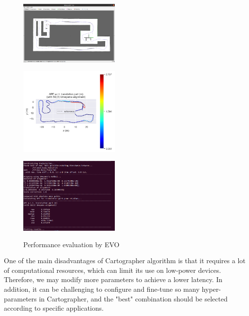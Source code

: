 \documentclass[hyperref]{article}
\theoremstyle{nonumberplain}
\begin{document}
\begin{figure}[H]
	\centering
	\begin{minipage}[t]{0.32\textwidth}
		\centering
		\includegraphics[width=5cm]{task3a_result4.png}
		\label{fig6a}
	\end{minipage}
	\begin{minipage}[t]{0.32\textwidth}
		\centering
		\includegraphics[width=5cm]{3a_evo2.png}
		\label{fig6b}
	\end{minipage}
	\begin{minipage}[t]{0.32\textwidth}
		\centering
		\includegraphics[width=5cm]{3a_evo3.png}
		\label{fig6c}
	\end{minipage}
	\caption{Performance evaluation by EVO}
	\label{fig6}
\end{figure} 

One of the main disadvantages of Cartographer algorithm is that it requires a lot of computational resources, which can limit its use on low-power devices. Therefore, we may modify more parameters to achieve a lower latency. In addition, it can be challenging to configure and fine-tune so many hyper-parameters in Cartographer, and the "best" combination should be selected according to specific applications.
\end{document}
